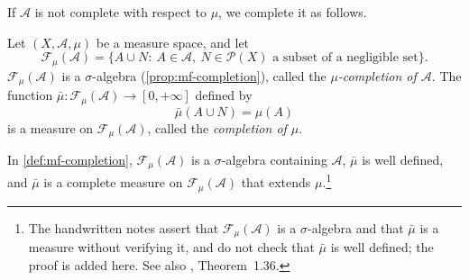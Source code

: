 
If $\mathcal A$ is not complete with respect to $\mu$, we complete it as follows.

\begin{definition}[Completion]\label{def:mf-completion}
Let $(X,\mathcal A,\mu)$ be a measure space, and let
\[
  \mathcal F_\mu(\mathcal A)=\big\{A\cup N:\ A\in\mathcal A,\ N\in\mathcal P(X)\text{ a subset
  of a negligible set}\big\}.
\]
$\mathcal F_\mu(\mathcal A)$ is a $\sigma$-algebra (\cref{prop:mf-completion}), called the
\emph{$\mu$-completion of $\mathcal A$}. The function
$\bar\mu:\mathcal F_\mu(\mathcal A)\to[0,+\infty]$ defined by
\[
  \bar\mu(A\cup N)=\mu(A)
\]
is a measure on $\mathcal F_\mu(\mathcal A)$, called the \emph{completion of $\mu$}.
\end{definition}

\begin{proposition}\label{prop:mf-completion}
In \cref{def:mf-completion}, $\mathcal F_\mu(\mathcal A)$ is a $\sigma$-algebra containing
$\mathcal A$, $\bar\mu$ is well defined, and $\bar\mu$ is a complete measure on
$\mathcal F_\mu(\mathcal A)$ that extends $\mu$.\footnote{The handwritten notes assert that
$\mathcal F_\mu(\mathcal A)$ is a $\sigma$-algebra and that $\bar\mu$ is a measure without
verifying it, and do not check that $\bar\mu$ is well defined; the proof is added here. See
also \citet{rudin-rca}, Theorem~1.36.}
\end{proposition}

